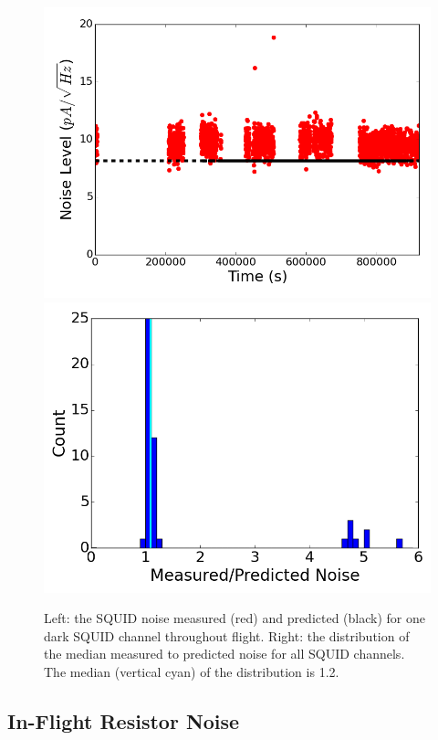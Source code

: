 \begin{figure}[htp]
\begin{center}
\includegraphics[width=0.48\columnwidth]{figures/board66_wire4_ch09_noise_vs_time.png}
\includegraphics[width=0.48\columnwidth]{figures/squid_noise_histogram.png}
\caption[SQUID noise versus time and histogram of all dark squids' median noise]{Left: the \ac{SQUID} noise measured (red) and predicted (black) for one dark \ac{SQUID} channel throughout flight. Right: the distribution of the median measured to predicted noise for all \ac{SQUID} channels. The median (vertical cyan) of the distribution is 1.2. 
\label{fig:squid_in_flight_nosie} }
\end{center}
\end{figure}


\subsection{In-Flight Resistor Noise}
\label{sec:flight_resistor_noise}

